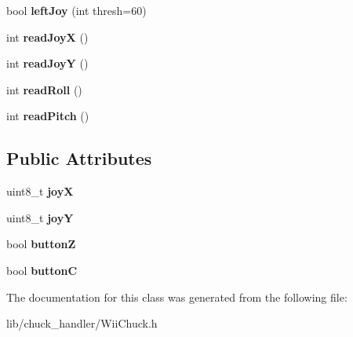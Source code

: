 \begin{DoxyCompactItemize}
\item 
bool {\bfseries left\+Joy} (int thresh=60)\hypertarget{classWiiChuck_aaf0615fbceebca7fa53c7bd44a3024c7}{}\label{classWiiChuck_aaf0615fbceebca7fa53c7bd44a3024c7}

\item 
int {\bfseries read\+JoyX} ()\hypertarget{classWiiChuck_a737788f861f6c1322f8f0218eb906625}{}\label{classWiiChuck_a737788f861f6c1322f8f0218eb906625}

\item 
int {\bfseries read\+JoyY} ()\hypertarget{classWiiChuck_aa760d0ae0b816b5266172fdab9ecc73b}{}\label{classWiiChuck_aa760d0ae0b816b5266172fdab9ecc73b}

\item 
int {\bfseries read\+Roll} ()\hypertarget{classWiiChuck_acc8ff7cb61bb58d699d281e155d2b26c}{}\label{classWiiChuck_acc8ff7cb61bb58d699d281e155d2b26c}

\item 
int {\bfseries read\+Pitch} ()\hypertarget{classWiiChuck_a01a58d8763cbdd8455e7bcf1e9f17619}{}\label{classWiiChuck_a01a58d8763cbdd8455e7bcf1e9f17619}

\end{DoxyCompactItemize}
\subsection*{Public Attributes}
\begin{DoxyCompactItemize}
\item 
uint8\+\_\+t {\bfseries joyX}\hypertarget{classWiiChuck_aa806dad19cc33123a5ffab3986efce9c}{}\label{classWiiChuck_aa806dad19cc33123a5ffab3986efce9c}

\item 
uint8\+\_\+t {\bfseries joyY}\hypertarget{classWiiChuck_a4446deddbfad254c91d2b9047190fc87}{}\label{classWiiChuck_a4446deddbfad254c91d2b9047190fc87}

\item 
bool {\bfseries buttonZ}\hypertarget{classWiiChuck_ade8e18e38ca0bd46abc6b4e065a1073d}{}\label{classWiiChuck_ade8e18e38ca0bd46abc6b4e065a1073d}

\item 
bool {\bfseries buttonC}\hypertarget{classWiiChuck_aa1808a0b3138f4714ed8a7b4b8f5b805}{}\label{classWiiChuck_aa1808a0b3138f4714ed8a7b4b8f5b805}

\end{DoxyCompactItemize}


The documentation for this class was generated from the following file\+:\begin{DoxyCompactItemize}
\item 
lib/chuck\+\_\+handler/Wii\+Chuck.\+h\end{DoxyCompactItemize}
